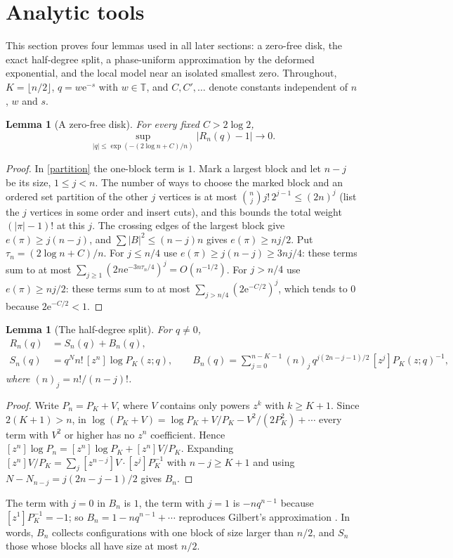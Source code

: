 \documentclass[11pt,a4paper]{article}
\newtheorem{lemma}[theorem]{Lemma}
\theoremstyle{remark}
\newcommand{\coef}[1]{[z^{#1}]}
\newcommand{\T}{\mathbb T}
\newcommand{\e}{\mathrm e}
\begin{document}
\section{Analytic tools}\label{sec:tools}
This section proves four lemmas used in all later sections: a zero-free disk, the exact half-degree split, a phase-uniform approximation by the deformed exponential, and the local model near an isolated smallest zero. Throughout, $K=\lfloor n/2\rfloor$, $q=w\e^{-s}$ with $w\in\T$, and $C,C',\ldots$ denote constants independent of $n$, $w$ and $s$.

\begin{lemma}[A zero-free disk]\label{lem:disk}
For every fixed $C>2\log2$,
\[
\sup_{|q|\le\exp(-(2\log n+C)/n)}|R_n(q)-1|\longrightarrow0 .
\]
\end{lemma}
\begin{proof}
In \eqref{partition} the one-block term is $1$. Mark a largest block and let $n-j$ be its size, $1\le j<n$. The number of ways to choose the marked block and an ordered set partition of the other $j$ vertices is at most $\binom nj j!\,2^{j-1}\le(2n)^j$ (list the $j$ vertices in some order and insert cuts), and this bounds the total weight $(|\pi|-1)!$ at this $j$. The crossing edges of the largest block give $e(\pi)\ge j(n-j)$, and $\sum|B|^2\le(n-j)n$ gives $e(\pi)\ge nj/2$. Put $\tau_n=(2\log n+C)/n$. For $j\le n/4$ use $e(\pi)\ge j(n-j)\ge3nj/4$: these terms sum to at most $\sum_{j\ge1}(2n\e^{-3n\tau_n/4})^j=O(n^{-1/2})$. For $j>n/4$ use $e(\pi)\ge nj/2$: these terms sum to at most $\sum_{j>n/4}(2\e^{-C/2})^j$, which tends to $0$ because $2\e^{-C/2}<1$.
\end{proof}

\begin{lemma}[The half-degree split]\label{lem:split}
For $q\ne0$,
\begin{align}
R_n(q)&=S_n(q)+B_n(q),\label{split}\\
S_n(q)&=q^{N}n!\,\coef n\log P_K(z;q),\qquad
B_n(q)=\sum_{j=0}^{n-K-1}(n)_j\,q^{j(2n-j-1)/2}\,\coef j P_K(z;q)^{-1},\nonumber
\end{align}
where $(n)_j=n!/(n-j)!$.
\end{lemma}
\begin{proof}
Write $P_n=P_K+V$, where $V$ contains only powers $z^k$ with $k\ge K+1$. Since $2(K+1)>n$, in $\log(P_K+V)=\log P_K+V/P_K-V^2/(2P_K^2)+\cdots$ every term with $V^2$ or higher has no $z^n$ coefficient. Hence $\coef n\log P_n=\coef n\log P_K+\coef n V/P_K$. Expanding $\coef n V/P_K=\sum_j\coef{n-j}V\cdot\coef jP_K^{-1}$ with $n-j\ge K+1$ and using $N-N_{n-j}=j(2n-j-1)/2$ gives $B_n$.
\end{proof}
The term with $j=0$ in $B_n$ is $1$, the term with $j=1$ is $-nq^{n-1}$ because $\coef1P_K^{-1}=-1$; so $B_n=1-nq^{n-1}+\cdots$ reproduces Gilbert's approximation \cite{Gilbert}. In words, $B_n$ collects configurations with one block of size larger than $n/2$, and $S_n$ those whose blocks all have size at most $n/2$.
\end{document}
